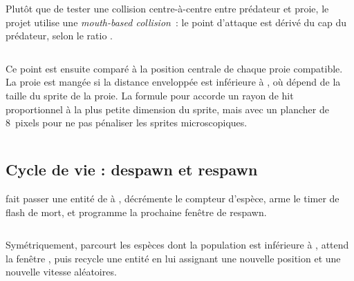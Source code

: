 Plutôt que de tester une collision centre-à-centre entre
prédateur et proie, le projet utilise une \emph{mouth-based
collision}~: le point d'attaque est dérivé du cap du prédateur,
selon le ratio .

\begin{listing}[h!]
\inputminted[firstline=33, lastline=41]{c}{../src/entity.c}
\caption{Calcul du point de bouche d'un prédateur.}
\label{lst:mouth}
\end{listing}

Ce point est ensuite comparé à la position centrale de chaque
proie compatible. La proie est mangée si la distance enveloppée
est inférieure à , où
 dépend de la taille du sprite de la proie. La
formule pour  accorde un rayon de hit
proportionnel à la plus petite dimension du sprite, mais avec un
plancher de 8~pixels pour ne pas pénaliser les sprites
microscopiques.

\begin{listing}[h!]
\inputminted[firstline=196, lastline=237]{c}{../src/world.c}
\caption{Détection des repas (extrait de ).}
\label{lst:eating}
\end{listing}

\subsection{Cycle de vie : despawn et respawn}

 fait passer une entité de  à
, décrémente le compteur d'espèce, arme le timer de
flash de mort, et programme la prochaine fenêtre de respawn.

\begin{listing}[h!]
\inputminted[firstline=116, lastline=138]{c}{../src/world.c}
\caption{Despawn d'une entité (extrait de ).}
\label{lst:despawn}
\end{listing}

Symétriquement,  parcourt les
espèces dont la population est inférieure à ,
attend la fenêtre , puis recycle une entité
 en lui assignant une nouvelle position et une
nouvelle vitesse aléatoires.

\begin{listing}[h!]
\inputminted[firstline=252, lastline=296]{c}{../src/world.c}
\caption{Logique de respawn (extrait de ).}
\label{lst:respawn}
\end{listing}

